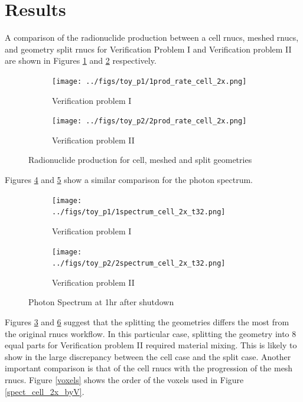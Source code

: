 \section{Results}
A comparison of the radionuclide production between a cell rnucs,
meshed rnucs, and geometry split rnucs  for Verification Problem
I and Verification problem II are shown in Figures
\ref{1prod_cell_2x} and \ref{2prod_cell_2x} respectively.\\
\begin{figure}[h]
 \begin{centering}
 \centering
 \begin{subfigure}[b]{.45\textwidth}
 \texttt{[image: ../figs/toy\_p1/1prod\_rate\_cell\_2x.png]}
 \caption{Verification problem I }
 \label{1prod_cell_2x}
 \end{subfigure}
 \hspace{0.05cm}
 \begin{subfigure}[b]{.45\textwidth}
 \centering
 \texttt{[image: ../figs/toy\_p2/2prod\_rate\_cell\_2x.png]}
 \caption{Verification problem II}
 \label{2prod_cell_2x}
 \end{subfigure}
 \caption{Radionuclide production for cell, meshed and split geometries}
 \label{prod_cell_2x}
 \end{centering}
\end{figure}
Figures \ref{1spect_cell_2x} and \ref{2spect_cell_2x} show a similar
comparison for the photon spectrum.\\
\begin{figure}[h!]
 \begin{centering}
 \centering
 \begin{subfigure}[b]{.45\textwidth}
 \texttt{[image: ../figs/toy\_p1/1spectrum\_cell\_2x\_t32.png]}
 \caption{Verification problem I }
 \label{1spect_cell_2x}
 \end{subfigure}
 \hspace{0.05cm}
 \begin{subfigure}[b]{.45\textwidth}
 \centering
 \texttt{[image: ../figs/toy\_p2/2spectrum\_cell\_2x\_t32.png]}
 \caption{Verification problem II}
 \label{2spect_cell_2x}
 \end{subfigure}
 \caption{Photon Spectrum at 1hr after shutdown }
 \label{spect_cell_2x}
 \end{centering}
\end{figure}
Figures \ref{prod_cell_2x} and \ref{spect_cell_2x} suggest that the splitting the geometries 
differs the most from the original rnucs workflow. In this particular case, splitting the geometry 
into 8 equal parts for Verification problem II required material mixing.
This is likely to show in the large discrepancy between the cell case and the split case.
Another important comparison is that of the cell rnucs with the progression of the mesh rnucs. 
Figure \ref{voxels} shows the order of the voxels used in Figure \ref{spect_cell_2x_byV}. 



